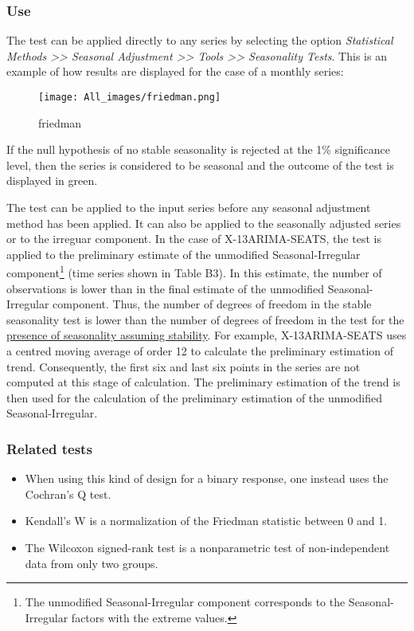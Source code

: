 \documentclass[
]{book}
\providecommand{\tightlist}{%
  \setlength{\itemsep}{0pt}\setlength{\parskip}{0pt}}
\begin{document}
\hypertarget{use-1}{%
\subsubsection{Use}\label{use-1}}

The test can be applied directly to any series by selecting the
option \emph{Statistical Methods \textgreater\textgreater{} Seasonal Adjustment \textgreater\textgreater{} Tools \textgreater\textgreater{} Seasonality Tests}. This is
an example of how results are displayed for the case of a monthly series:

\begin{figure}
\centering
\texttt{[image: All\_images/friedman.png]}
\caption{friedman}
\end{figure}

If the null hypothesis of no stable seasonality is rejected at the 1\% significance level, then the series is
considered to be seasonal and the outcome of the test is displayed in green.

The test can be applied to the input series before any seasonal adjustment method has been
applied. It can also be applied to the seasonally adjusted series or to the irreguar component. In the case of
X-13ARIMA-SEATS, the test is applied to the preliminary estimate
of the unmodified Seasonal-Irregular component\footnote{The unmodified Seasonal-Irregular component corresponds to the
  Seasonal-Irregular factors with the extreme values.} (time series shown
in Table B3). In this estimate, the number of observations is lower than
in the final estimate of the unmodified Seasonal-Irregular component.
Thus, the number of degrees of freedom in the stable
seasonality test is lower than the number of degrees of freedom in the
test for the \href{../theory/Tests_presence_stability.html}{presence of seasonality assuming stability}. For
example, X-13ARIMA-SEATS uses a centred moving average of order 12 to
calculate the preliminary estimation of trend. Consequently, the first
six and last six points in the series are not computed at this stage of
calculation. The preliminary estimation of the trend is then used for
the calculation of the preliminary estimation of the unmodified Seasonal-Irregular.

\hypertarget{related-tests}{%
\subsubsection{Related tests}\label{related-tests}}

\begin{itemize}
\tightlist
\item
  When using this kind of design for a binary response, one instead uses the Cochran's Q test.
\item
  Kendall's W is a normalization of the Friedman statistic between 0 and 1.
\item
  The Wilcoxon signed-rank test is a nonparametric test of non-independent data from only two groups.
\end{itemize}
\end{document}

